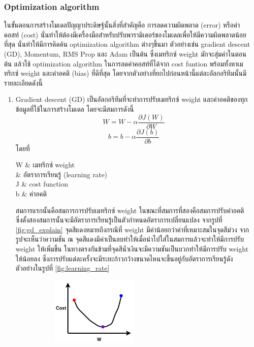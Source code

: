 \subsubsection{Optimization algorithm}
ในขั้นตอนการสร้างโมเดลปัญญาประดิษฐ์นั้นสิ่งที่สำคัญคือ การลดความผิดพลาด (error) หรือค่าคอสท์ (cost) นั่นทำให้ต้องมีเครื่องมือสำหรับปรับพารามิเตอร์ของโมเดลเพื่อให้มีความผิดพลาดน้อยที่สุด
นั่นทำให้มีการคิดค้น optimization algorithm ต่างๆขึ้นมา ตัวอย่างเช่น gradient descent (GD), Momentum, RMS Prop และ Adam เป็นต้น
ซึ่งเมทริกซ์ weight มักจะสุ่มค่าในตอนต้น แล้วใช้ optimization algorithm ในการลดค่าคอสท์ที่ได้จาก cost funtion พร้อมทั้งหาเมทริกซ์ weight และค่าอคติ (bias) ที่ดีที่สุด
โดยจากตัวอย่างที่ยกไปก่อนหน้านี้แต่ละอัลกอริทึมนั้นมีรายละเอียดดังนี้
\begin{enumerate}
	\item Gradient descent (GD) เป็นอัลกอริทึมที่จะทำการปรับเมทริกซ์ weight และค่าอคติของทุกข้อมูลที่ใช้ในการสร้างโมเดล โดยจะมีสมการดังนี้
	\begin{equation}
		W = W - \alpha \frac{\partial J(W)}{\partial W}
	\end{equation}
	\begin{equation}
		b = b - \alpha \frac{\partial J(b)}{\partial b}
	\end{equation}
	โดยที่
	\begin{conditions}
		W & เมทริกซ์ weight\\
		\alpha & อัตราการเรียนรู้ (learning rate)\\
		J & cost function\\
		b & ค่าอคติ
	\end{conditions}
	สมการแรกนั้นคือสมการการปรับเมทริกซ์ weight ในขณะที่สมการที่สองคือสมการปรับค่าอคติ ซึ่งตั้งสองสมการนั้นจะมีอัตราการเรียนรู้เป็นตัวกำหนดอัตราการเปลี่ยนแปลง จากรูปที่ \ref{fig:gd_explain}
	จุดสีแดงหมายถึงกรณีที่ weight มีค่าน้อยกว่าค่าที่เหมาะสมในจุดสีม่วง จากรูปจะเห็นว่าความชัน ณ จุดสีแดงมีค่าเป็นลบทำให้เมื่อนำไปใส่ในสมการแล้วจะทำให้มีการปรับ weight ให้เพิ่มขึ้น 
	ในทางตรงกันข้ามที่จุดสีน้ำเงินจะมีความชันเป็นบวกทำให้มีการปรับ weight ให้น้อยลง ซึ่งการปรับแต่ละครั้งจะมีระยะก้าวกว้างขนาดไหนจะขึ้นอยู่กับอัตราการเรียนรู้ดังตัวอย่างในรูปที่ \ref{fig:learning_rate}
	\begin{figure}
		\begin{subfigure}[!ht]{0.5\textwidth}
			\centering
			\includegraphics[width=0.5\textwidth]{chapter2/images/gd_explain.png}

\end{subfigure}
\end{figure}
\end{enumerate}

